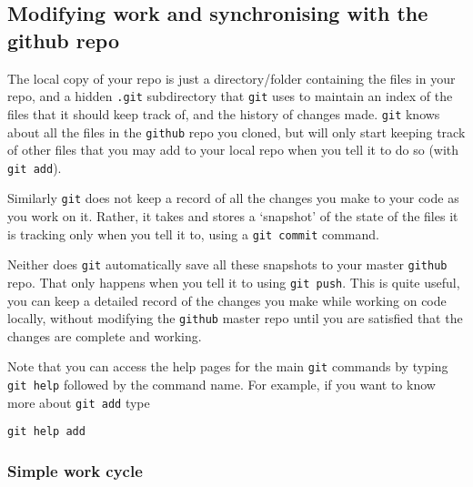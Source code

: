 \documentclass[10pt] {article}
\theoremstyle{definition}
\begin{document}
\subsection{Modifying work and synchronising with the github repo}

The local copy of your repo is just a directory/folder containing the files in your repo, and a hidden {\tt .git} subdirectory that {\tt git} uses to maintain an index of the files that it should keep track of, and the history of changes made. {\tt git} knows about all the files in the {\tt github} repo you cloned, but will only start keeping track of other files that you may add to your local repo when you tell it to do so (with \lstinline+git add+). 

Similarly {\tt git} does not keep a record of all the changes you make to your code as you work on it. Rather, it takes and stores a `snapshot' of the state of the files it is tracking only when you tell it to, using a {\tt git commit} command. 

Neither does {\tt git} automatically save all these snapshots to your master {\tt github} repo. That only happens when you tell it to using {\tt git push}. This is quite useful, you can keep a detailed record of the changes you make while working on code locally, without modifying the {\tt github} master repo until you are satisfied that the changes are complete and working.   

Note that you can access the help pages for the main {\tt git} commands by typing {\tt git help} followed by the command name. For example, if you want to know more about {\tt git add} type 
\begin{lstlisting}
git help add
\end{lstlisting}

\subsubsection{Simple work cycle}
\end{document}
